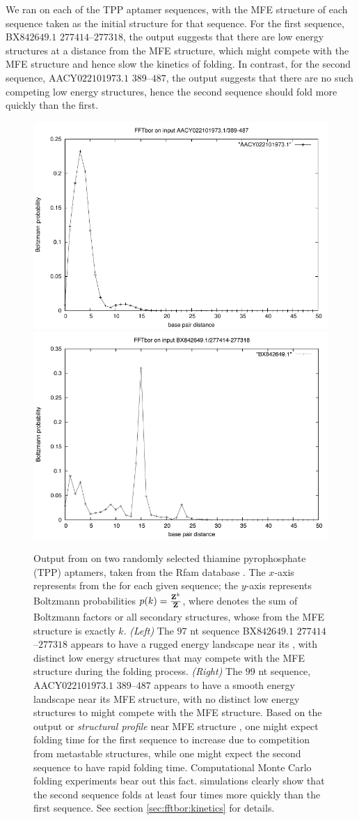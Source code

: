 We ran \fftbor on each of the TPP \rb aptamer
sequences, with the MFE structure of each
sequence taken as the initial structure \strSt for that sequence. For the
first sequence, BX$842649.1$ $277414$--$277318$, the \fftbor output
suggests that there are low energy structures
at a distance from the MFE structure, which might compete with the MFE
structure and hence slow the kinetics of folding. In contrast, for the
second sequence, AACY$022101973.1$ $389$--$487$, the \fftbor output suggests
that there are no such competing low energy structures, hence
the second sequence should fold more quickly than the first.

\begin{figure}[!ht]
\centering
\includegraphics[width=.45\textwidth]{Figures/FFTbor/FFTbor_AACY022101973_1.pdf}
\quad
\includegraphics[width=.45\textwidth]{Figures/FFTbor/FFTbor_BX842649_1.pdf}
\caption[Output from \fftbor on two randomly selected
thiamine pyrophosphate \rb (TPP) aptamers]{Output from \fftbor on two randomly selected
thiamine pyrophosphate \rb (TPP) aptamers, taken from the Rfam database
\citep{Gardner.nar11}. The $x$-axis represents \bpd from the
\mfes for each given sequence; the $y$-axis represents
Boltzmann probabilities $p(k) = \frac{{\bf Z}^{k}_{}}{{\bf Z}^{}_{}}$, where
 denotes the sum of Boltzmann factors or all secondary structures,
whose \bpd from the MFE structure is exactly $k$.
{\em (Left)}
The $97$ nt sequence BX$842649.1$ $277414$--$277318$ appears to have a rugged energy
landscape near its \mfes, with distinct
low energy structures that may compete with the MFE structure during the
folding process.
{\em (Right)}
The $99$ nt sequence, AACY$022101973.1$ $389$--$487$ appears to have a smooth energy
landscape near its MFE structure, with no distinct low energy structures
to might compete with the MFE structure.
Based on the \fftbor output or {\em structural profile} near MFE
structure \strSt, one might expect
folding time for the first sequence to increase due to competition from
metastable structures, while one might expect the second sequence to have
rapid folding time.
Computational Monte Carlo folding experiments bear out this fact.
\kinfold \citep{flamm} simulations clearly show that the second
sequence folds
at least four times more quickly than the first sequence. See section
\ref{sec:fftbor:kinetics} for
details.}
\label{fig:fftbor:tppDistributions}
\end{figure}

